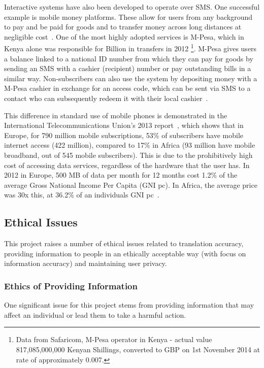 \documentclass{article}
\begin{document}
Interactive systems have also been developed to operate over SMS.  One successful example is mobile money platforms.  These allow for users from any background to pay and be paid for goods and to transfer money across long distances at negligible cost~\cite{Aker_Mobile_Phones_2010}.  One of the most highly adopted services is M-Pesa, which in Kenya alone was responsible for  Billion in transfers in 2012 \footnote{Data from Safaricom, M-Pesa operator in Kenya - actual value 817,085,000,000 Kenyan Shillings, converted to GBP on 1st November 2014 at rate of approximately 0.007.}.  M-Pesa gives users a balance linked to a national ID number from which they can pay for goods by sending an SMS with a cashier (recipient) number or pay outstanding bills in a similar way.  Non-subscribers can also use the system by depositing money with a M-Pesa cashier in exchange for an access code, which can be sent via SMS to a contact who can subsequently redeem it with their local cashier~\cite{Aker_Mobile_Phones_2010}.

This difference in standard use of mobile phones is demonstrated in the International Telecommunications Union's 2013 report~\cite{ITU_Cell_Usage_2013}, which shows that in Europe, for 790 million mobile subscriptions, 53\% of subscribers have mobile internet access (422 million), compared to 17\% in Africa (93 million have mobile broadband, out of 545 mobile subscribers).  This is due to the prohibitively high cost of accessing data services, regardless of the hardware that the user has.  In 2012 in Europe, 500 MB of data per month for 12 months cost 1.2\% of the average Gross National Income Per Capita (GNI pc).  In Africa, the average price was 30x this, at 36.2\% of an individuals GNI pc~\cite{ITU_Information_Society_2013}.


\subsection{Ethical Issues}
This project raises a number of ethical issues related to translation accuracy, providing information to people in an ethically acceptable way (with focus on information accuracy) and maintaining user privacy.

\subsubsection{Ethics of Providing Information}
One significant issue for this project stems from providing information that may affect an individual or lead them to take a harmful action.
\end{document}
